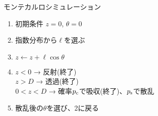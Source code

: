 \begin{frame}[t,fragile]{モンテカルロシミュレーション}
  \begin{enumerate}
  \item 初期条件 $z=0$, $\theta = 0$
  \item {\color{red} 指数分布から$\ell$を選ぶ}
  \item $z \leftarrow z + \ell \cos \theta$
  \item $z<0$ → 反射(終了) \\
    $z>D$ → 透過(終了) \\
    $0 < z < D$ → 確率$p_{\rm c}$で吸収(終了)、$p_{\rm s}$で散乱
  \item {\color{red} 散乱後の$\theta$を選び}、2に戻る
  \end{enumerate}
  \vspace*{-3.5cm}\hspace{8cm}
\end{frame}
